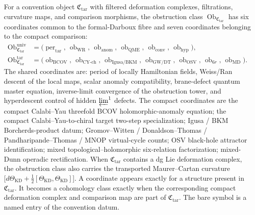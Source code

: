 For a convention object \(\mathfrak C_{\mathrm{tar}}\) with filtered
deformation complexes, filtrations, curvature maps, and comparison
morphisms, the obstruction class
\(\operatorname{Ob}_{\mathfrak C_{\mathrm{tar}}}\) has six coordinates
common to the formal-Darboux fibre and seven coordinates belonging to
the compact comparison:
\begin{align*}
  \operatorname{Ob}_{\mathfrak C_{\mathrm{tar}}}^{\mathrm{univ}}
    &=\bigl(
      \operatorname{per}_{\mathrm{tar}},\,
      \operatorname{ob}_{\mathrm{WR}},\,
      \operatorname{ob}_{\mathrm{anom}},\,
      \operatorname{ob}_{\mathrm{QME}},\,
      \operatorname{ob}_{\mathrm{conv}},\,
      \operatorname{ob}_{\mathrm{hyp}}
    \bigr),\\
  \operatorname{Ob}_{\mathfrak C_{\mathrm{tar}}}^{\mathrm{tar}}
    &=\bigl(
      \operatorname{ob}_{\mathrm{BCOV}},\,
      \operatorname{ob}_{\mathrm{CY\mbox{-}ch}},\,
      \operatorname{ob}_{\mathrm{Igusa/BKM}},\,
      \operatorname{ob}_{\mathrm{GW/DT}},\,
      \operatorname{ob}_{\mathrm{OSV}},\,
      \operatorname{ob}_{6r},\,
      \operatorname{ob}_{\mathrm{MD}}
    \bigr).
\end{align*}
The shared coordinates are: period of locally Hamiltonian fields,
Weiss/Ran descent of the local maps, scalar anomaly compatibility,
brane-defect quantum master equation, inverse-limit convergence of
the obstruction tower, and hyperdescent control of hidden
\(\varprojlim^1\) defects.  The compact coordinates are the compact
Calabi--Yau threefold BCOV
holomorphic-anomaly equation; the compact Calabi--Yau-to-chiral target two-step
specialization; Igusa / BKM Borcherds-product datum; Gromov--Witten
/ Donaldson--Thomas / Pandharipande--Thomas / MNOP virtual-cycle
counts; OSV black-hole attractor identification; mixed
topological--holomorphic six-relation factorization; mixed-Dunn
operadic rectification.  When \(\mathfrak C_{\mathrm{tar}}\) contains a
dg Lie deformation complex, the obstruction class also carries the
transported Maurer--Cartan curvature
\(\bigl[d\Theta_{\mathrm{KD}}+
  \tfrac12[\Theta_{\mathrm{KD}},\Theta_{\mathrm{KD}}]\bigr]\).
A coordinate appears exactly for a structure present in
\(\mathfrak C_{\mathrm{tar}}\).  It becomes a cohomology class exactly
when the corresponding compact deformation complex and comparison map
are part of \(\mathfrak C_{\mathrm{tar}}\).  The bare symbol is a named
entry of the convention datum.

